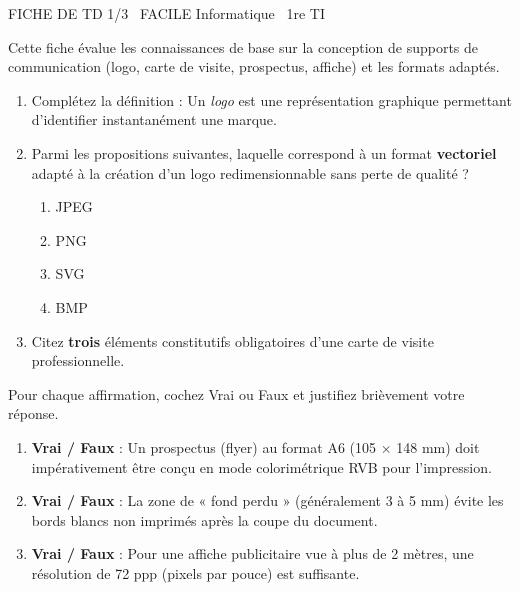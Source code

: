 \documentclass[11pt]{article}
\begin{document}
\begin{tcolorbox}[enhanced,colback=popink,colframe=popink,arc=10pt,boxrule=0pt,left=12pt,right=12pt,top=9pt,bottom=9pt]
{\color{white}\popxbold\small FICHE DE TD 1/3 \textbullet\ FACILE \hfill Informatique \textbullet\ 1re TI\par}
\end{tcolorbox}
\vspace{4pt}
Cette fiche évalue les connaissances de base sur la conception de supports de communication (logo, carte de visite, prospectus, affiche) et les formats adaptés.

\begin{exercice}
\begin{enumerate}
    \item Complétez la définition : Un \textit{logo} est une représentation graphique \underline{\hspace{4cm}} permettant d'identifier instantanément une marque.
    \item Parmi les propositions suivantes, laquelle correspond à un format \textbf{vectoriel} adapté à la création d'un logo redimensionnable sans perte de qualité ?
    \begin{enumerate}
        \item JPEG \item PNG \item SVG \item BMP
    \end{enumerate}
    \item Citez \textbf{trois} éléments constitutifs obligatoires d'une carte de visite professionnelle.
\end{enumerate}
\end{exercice}

\begin{exercice}
Pour chaque affirmation, cochez Vrai ou Faux et justifiez brièvement votre réponse.
\begin{enumerate}
    \item \textbf{Vrai / Faux} : Un prospectus (flyer) au format A6 (105 $\times$ 148 mm) doit impérativement être conçu en mode colorimétrique RVB pour l'impression.
    \hfill \underline{\hspace{5cm}}
    \item \textbf{Vrai / Faux} : La zone de « fond perdu » (généralement 3 à 5 mm) évite les bords blancs non imprimés après la coupe du document.
    \hfill \underline{\hspace{5cm}}
    \item \textbf{Vrai / Faux} : Pour une affiche publicitaire vue à plus de 2 mètres, une résolution de 72 ppp (pixels par pouce) est suffisante.
    \hfill \underline{\hspace{5cm}}
\end{enumerate}
\end{exercice}
\end{document}
